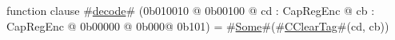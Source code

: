 function clause #\hyperref[zdecode]{decode}# (0b010010 @ 0b00100 @ cd : CapRegEnc @ cb : CapRegEnc @ 0b00000 @ 0b000@ 0b101)    = #\hyperref[zSome]{Some}#(#\hyperref[zCClearTag]{CClearTag}#(cd, cb))
